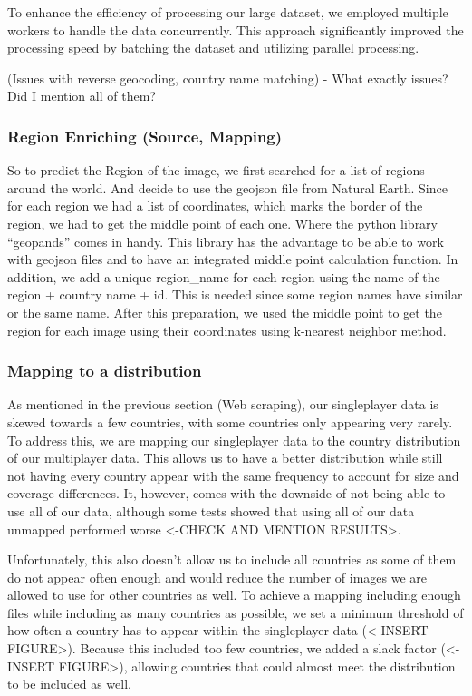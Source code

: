 \documentclass{article}
\begin{document}
To enhance the efficiency of processing our large dataset, we employed
multiple workers to handle the data concurrently. This approach
significantly improved the processing speed by batching the dataset and
utilizing parallel processing.

(Issues with reverse geocoding, country name matching) - What exactly
issues? Did I mention all of them?

\subsubsection{Region Enriching (Source,
Mapping)}\label{region-enriching-source-mapping}

So to predict the Region of the image, we first searched for a list of
regions around the world. And decide to use the geojson file from
Natural Earth. Since for each region we had a list of coordinates, which
marks the border of the region, we had to get the middle point of each
one. Where the python library ``geopands'' comes in handy. This library
has the advantage to be able to work with geojson files and to have an
integrated middle point calculation function. In addition, we add a
unique region\_name for each region using the name of the region +
country name + id. This is needed since some region names have similar
or the same name. After this preparation, we used the middle point to
get the region for each image using their coordinates using k-nearest
neighbor method.

\subsubsection{Mapping to a
distribution}\label{mapping-to-a-distribution}

As mentioned in the previous section (Web scraping), our singleplayer
data is skewed towards a few countries, with some countries only
appearing very rarely. To address this, we are mapping our singleplayer
data to the country distribution of our multiplayer data. This allows us
to have a better distribution while still not having every country
appear with the same frequency to account for size and coverage
differences. It, however, comes with the downside of not being able to
use all of our data, although some tests showed that using all of our
data unmapped performed worse \textless-CHECK AND MENTION
RESULTS\textgreater.

Unfortunately, this also doesn't allow us to include all countries as
some of them do not appear often enough and would reduce the number of
images we are allowed to use for other countries as well. To achieve a
mapping including enough files while including as many countries as
possible, we set a minimum threshold of how often a country has to
appear within the singleplayer data (\textless-INSERT
FIGURE\textgreater). Because this included too few countries, we added a
slack factor (\textless-INSERT FIGURE\textgreater), allowing countries
that could almost meet the distribution to be included as well.
\end{document}
